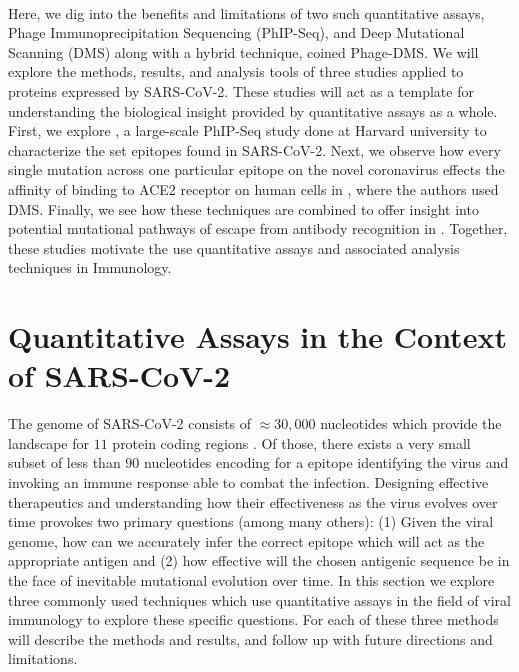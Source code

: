 \documentclass{article}
\begin{document}
~ 

Here, we dig into the benefits and limitations of two such quantitative assays, Phage Immunoprecipitation Sequencing (PhIP-Seq), and Deep Mutational Scanning (DMS) along with a hybrid technique, coined Phage-DMS. 
We will explore the methods, results, and analysis tools of three studies applied to proteins expressed by SARS-CoV-2.
These studies will act as a template for understanding the biological insight provided by quantitative assays as a whole.
First, we explore \citet{Shrock2020}, a large-scale PhIP-Seq study done at Harvard university to characterize the set epitopes found in SARS-CoV-2.
Next, we observe how every single mutation across one particular epitope on the novel coronavirus effects the affinity of binding to ACE2 receptor on human cells in \cite{Starr2020}, where the authors used DMS.
Finally, we see how these techniques are combined to offer insight into potential mutational pathways of escape from antibody recognition in \citet{Garrett2020}.
Together, these studies motivate the use quantitative assays and associated analysis techniques in Immunology.

\section*{Quantitative Assays in the Context of SARS-CoV-2}

The genome of SARS-CoV-2 consists of $\approx 30,000$ nucleotides which provide the landscape for $11$ protein coding regions \citep{Naqvi2020}.
Of those, there exists a very small subset of less than $90$ nucleotides encoding for a epitope identifying the virus and invoking an immune response able to combat the infection.
Designing effective therapeutics and understanding how their effectiveness as the virus evolves over time provokes two primary questions (among many others):
(1) Given the viral genome, how can we accurately infer the correct epitope which will act as the appropriate antigen and 
(2) how effective will the chosen antigenic sequence be in the face of inevitable mutational evolution over time.
In this section we explore three commonly used techniques which use quantitative assays in the field of viral immunology to explore these specific questions. 
For each of these three methods will describe the methods and results, and follow up with future directions and limitations.
\end{document}
